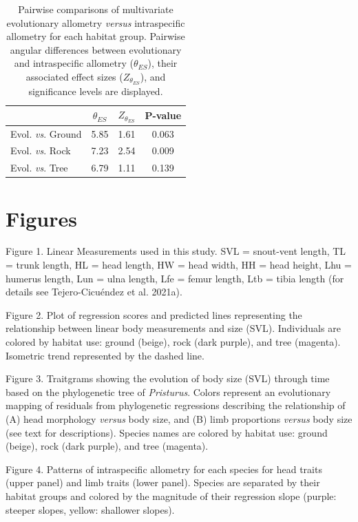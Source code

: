 \documentclass[
  11pt,
]{article}
\begin{document}
\begin{table}[H]

\caption{\label{tab:unnamed-chunk-4}Pairwise comparisons of multivariate evolutionary allometry \textit{versus} intraspecific allometry for each habitat group. Pairwise angular differences between evolutionary and intraspecific allometry ($\theta_{ES}$), their associated effect sizes ($Z_{\theta_{ES}}$), and significance levels are displayed.}
\centering
\begin{tabular}[t]{lccc}
\toprule
  & $\theta_{ES}$ & $Z_{\theta_{ES}}$ & P-value\\
\midrule
Evol. \textit{vs}. Ground & 5.85 & 1.61 & 0.063\\
Evol. \textit{vs}. Rock & 7.23 & 2.54 & 0.009\\
Evol. \textit{vs}. Tree & 6.79 & 1.11 & 0.139\\
\bottomrule
\end{tabular}
\end{table}

\newpage

\hypertarget{figures}{%
\section{Figures}\label{figures}}

Figure 1. Linear Measurements used in this study. SVL = snout-vent
length, TL = trunk length, HL = head length, HW = head width, HH = head
height, Lhu = humerus length, Lun = ulna length, Lfe = femur length, Ltb
= tibia length (for details see Tejero-Cicuéndez et al. 2021a).

Figure 2. Plot of regression scores and predicted lines representing the
relationship between linear body measurements and size (SVL).
Individuals are colored by habitat use: ground (beige), rock (dark
purple), and tree (magenta). Isometric trend represented by the dashed
line.

Figure 3. Traitgrams showing the evolution of body size (SVL) through
time based on the phylogenetic tree of \emph{Pristurus}. Colors
represent an evolutionary mapping of residuals from phylogenetic
regressions describing the relationship of (A) head morphology
\emph{versus} body size, and (B) limb proportions \emph{versus} body
size (see text for descriptions). Species names are colored by habitat
use: ground (beige), rock (dark purple), and tree (magenta).

Figure 4. Patterns of intraspecific allometry for each species for head
traits (upper panel) and limb traits (lower panel). Species are
separated by their habitat groups and colored by the magnitude of their
regression slope (purple: steeper slopes, yellow: shallower slopes).
\end{document}
